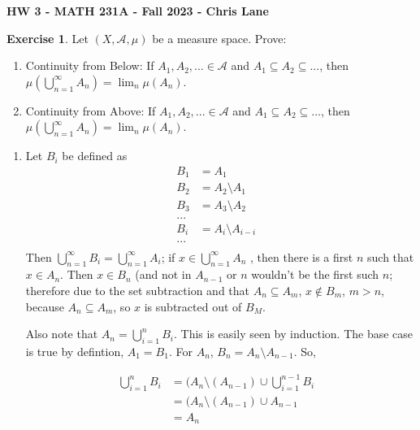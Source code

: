 \documentclass[11pt,oneside]{article}
\numberwithin{equation}{section}
\theoremstyle{definition}
\newtheorem{exercise}{Exercise}
\begin{document}
\textbf{HW 3 - MATH 231A - Fall 2023 - Chris Lane}

\begin{exercise}
  Let $(X, \mathcal{A}, \mu)$ be a measure space.  Prove:
  \begin{enumerate}
  \item
    Continuity from Below: If $A_1, A_2, ... \in \mathcal{A}$ and $A_1 \subseteq A_2 \subseteq ...$, then
    $\mu ( \bigcup \limits _{n=1} ^\infty A_n ) = \lim _n  \mu ( A_n)$.
  \item
    Continuity from Above: If $A_1, A_2, ... \in \mathcal{A}$ and $A_1 \subseteq A_2 \subseteq ...$, then
    $\mu ( \bigcup \limits _{n=1} ^\infty A_n ) = \lim _n \mu(A_n)$.
  \end{enumerate}
\end{exercise}
\begin{solution}
  \begin{enumerate}
  \item
    Let $B_i$ be defined as
    \begin{align*}
      B_1 &= A_1 & \\
      B_2 &= A_2 \setminus A_1 & \\
      B_3 &= A_3 \setminus A_2 & \\
      ...\\
      B_i & = A_i \setminus A_{i-i} & \\
      ...\\
    \end{align*}
    Then $\bigcup \limits _{n=1} ^ \infty B_i = \bigcup \limits _{n=1}
    ^ \infty A_i$; if $x \in \bigcup \limits _ {n=1} ^ \infty A_n$ ,
    then there is a first $n$ such that $x \in A_n$.  Then $x \in B_n$
    (and not in $A_{n-1}$ or $n$ wouldn't be the first such $n$;
    therefore due to the set subtraction and that $A_n \subseteq A_m$,
    $x \notin B_m$, $m > n$, because $A_n \subseteq A_m$, so $x$ is subtracted out of $B_M$.

    Also note that $A_n = \bigcup \limits _ {i = 1}^n B_i$.  This is easily seen by induction.  The base case is true by defintion, $A_1 = B_1$.
    For $A_n$, $B_n = A_n \setminus A_{n-1}$.  So, 

    \begin{align*} 
      \bigcup \limits _ {i=1}^n B_i &= ( A_n \setminus ( A_{n-1} ) \cup \bigcup \limits _ {i=1} ^ {n-1} B_i &\\
       &= ( A_n \setminus ( A_{n-1} ) \cup A_{n-1} & \\
       &= A_n \\
    \end{align*}


\end{enumerate}
\end{solution}
\end{document}
